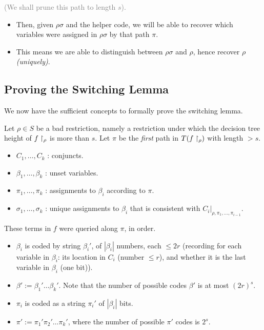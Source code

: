 \begin{tcolorbox}[colframe=white, colback=blue!4, boxrule=0mm, sharp corners]
\begin{itemize}
    \textcolor{gray}{(We shall prune this path to length \( s \)).}
\end{itemize}

\begin{itemize}
    \item Then, given \( \rho\sigma \) and the helper code, we will be able to recover which variables were assigned in \( \rho\sigma \) by that path \( \pi \).
    
    \item This means we are able to distinguish between \( \rho\sigma \) and \( \rho \), hence recover \( \rho \) \emph{(uniquely)}.
\end{itemize}
\end{tcolorbox}

\subsection{Proving the Switching Lemma}
We now have the sufficient concepts to formally prove the switching lemma. 
 
Let \( \rho \in S \) be a bad restriction, namely a restriction under which the decision tree height of $f\upharpoonright_\rho$ is more than $s$.  
Let \( \pi \) be the \emph{first} path in \( T(f\upharpoonright_{\rho}) \) with length \( > s \).

\begin{itemize}
    \item \( C_1, \dots, C_k \) : conjuncts.
    \item \( \beta_1, \dots, \beta_k \) : unset variables.
    \item \( \pi_1, \dots, \pi_k \) : assignments to \( \beta_i \) according to \( \pi \).
    \item \( \sigma_1, \dots, \sigma_k \) : unique assignments to \( \beta_i \) that is consistent with \( C_i |_{\rho, \pi_1, \dots, \pi_{i-1}} \).
\end{itemize}
These terms in \( f \) were queried along \( \pi \), in order.

\begin{itemize}
    \item \( \beta_i \) is coded by string \( \beta_i' \), of \( |\beta_i| \) numbers, each \( \leq 2r \) (recording for each variable in \( \beta_i \): its location in \( C_i \) (number \( \leq r \)), and whether it is the last variable in \( \beta_i \) (one bit)).
    \item \( \beta' := \beta_1' \dots \beta_k' \). Note that the number of possible codes $\beta'$ is at most $ (2r)^s $.
    \item \( \pi_i \) is coded as a string \( \pi_i' \) of \( |\beta_i| \) bits.
    \item \( \pi' := \pi_1' \pi_2' \dots \pi_k' \), where the number of possible \( \pi' \) codes is \( 2^s \).
\end{itemize}



